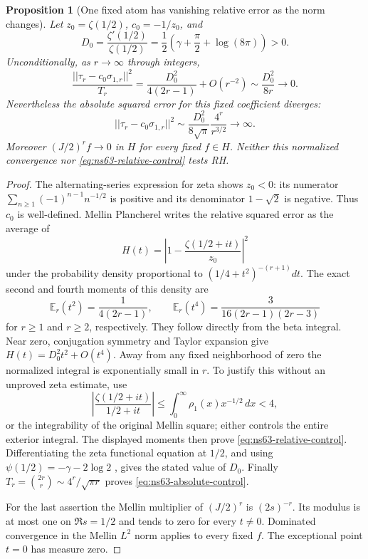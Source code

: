 \documentclass[11pt]{article}
\def\norm#1{||#1||}%
\newtheorem{proposition}[theorem]{Proposition}
\theoremstyle{remark}
\newcommand{\norm}[1]{\left\lVert #1\right\rVert}
\begin{document}
\begin{proposition}[One fixed atom has vanishing relative error as the norm changes]
\label{prop:ns63-one-atom}
Let $z_0=\zeta(1/2)$, $c_0=-1/z_0$, and
\[
 D_0=\frac{\zeta'(1/2)}{\zeta(1/2)}
     =\frac12\left(\gamma+\frac\pi2+\log(8\pi)\right)>0.
\]
Unconditionally, as $r\to\infty$ through integers,
\begin{equation}
 \frac{\norm{\tau_r-c_0\sigma_{1,r}}^2}{T_r}
    =\frac{D_0^2}{4(2r-1)}+O(r^{-2})
    \sim\frac{D_0^2}{8r}\longrightarrow0.
 \label{eq:ns63-relative-control}
\end{equation}
Nevertheless the absolute squared error for this fixed coefficient
diverges:
\begin{equation}
 \norm{\tau_r-c_0\sigma_{1,r}}^2
      \sim\frac{D_0^2}{8\sqrt\pi}\frac{4^r}{r^{3/2}}
      \longrightarrow\infty.
 \label{eq:ns63-absolute-control}
\end{equation}
Moreover $(J/2)^rf\to0$ in $H$ for every fixed $f\in H$.
Neither this normalized convergence nor
\eqref{eq:ns63-relative-control} tests RH.
\end{proposition}
\begin{proof}
The alternating-series expression for zeta shows $z_0<0$: its
numerator $\sum_{n\geq1}(-1)^{n-1}n^{-1/2}$ is positive and its
denominator $1-\sqrt2$ is negative. Thus $c_0$ is well-defined.
Mellin Plancherel writes the relative squared error as the average of
\[
 H(t)=\left|1-\frac{\zeta(1/2+it)}{z_0}\right|^2
\]
under the probability density proportional to
$(1/4+t^2)^{-(r+1)}dt$. The exact second and fourth moments of this
density are
\[
 \mathbb E_r(t^2)=\frac1{4(2r-1)},\qquad
 \mathbb E_r(t^4)=\frac3{16(2r-1)(2r-3)}
\]
for $r\geq1$ and $r\geq2$, respectively. They follow directly
from the beta integral. Near zero, conjugation symmetry and Taylor
expansion give $H(t)=D_0^2t^2+O(t^4)$.
Away from any fixed neighborhood of zero the normalized integral is
exponentially small in $r$. To justify this without an unproved zeta
estimate, use
\[
 \left|\frac{\zeta(1/2+it)}{1/2+it}\right|
 \leq\int_0^\infty\rho_1(x)x^{-1/2}\,dx<4,
\]
or the integrability of the original Mellin square; either controls
the entire exterior integral. The displayed moments then prove
\eqref{eq:ns63-relative-control}. Differentiating the zeta functional
equation at $1/2$, and using
$\psi(1/2)=-\gamma-2\log2$ \cite[Eq. (5.4.13)]{DLMFGammaBounds},
gives the stated value of $D_0$.
Finally $T_r=\binom{2r}{r}\sim4^r/\sqrt{\pi r}$ proves
\eqref{eq:ns63-absolute-control}.

For the last assertion the Mellin multiplier of $(J/2)^r$ is
$(2s)^{-r}$. Its modulus is at most one on $\Re s=1/2$ and tends
to zero for every $t\ne0$. Dominated convergence in the Mellin
$L^2$ norm applies to every fixed $f$. The exceptional point $t=0$
has measure zero.
\end{proof}
\end{document}
